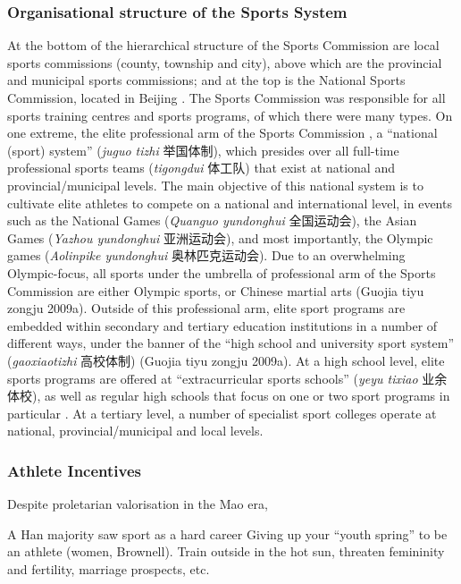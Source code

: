 {\subsubsection{Organisational structure of the Sports System}
At the bottom of the hierarchical structure of the Sports Commission are local sports commissions (county, township and city), above which are the provincial and municipal sports commissions; and at the top is the National Sports Commission, located in Beijing \citep[59]{Brownell1995}.  The Sports Commission was responsible for all sports training centres and sports programs, of which there were many types.  On one extreme, the elite professional arm of the Sports Commission , a ``national (sport) system'' (\textit{juguo tizhi} 举国体制), which presides over all full-time professional sports teams (\textit{tigongdui} 体工队) that exist at national and provincial/municipal levels.  The main objective of this national system is to cultivate elite athletes to compete on a national and international level, in events such as the National Games (\textit{Quanguo yundonghui} 全国运动会), the Asian Games (\textit{Yazhou yundonghui} 亚洲运动会), and most importantly, the Olympic games (\textit{Aolinpike yundonghui} 奥林匹克运动会).  Due to an overwhelming Olympic-focus, all sports under the umbrella of professional arm of the Sports Commission are either Olympic sports, or Chinese martial arts (Guojia tiyu zongju 2009a).  Outside of this professional arm, elite sport programs are embedded within secondary and tertiary education institutions in a number of different ways, under the banner of the ``high school and university sport system'' (\textit{gaoxiaotizhi} 高校体制) (Guojia tiyu zongju 2009a).  At a high school level, elite sports programs are offered at ``extracurricular sports schools'' (\textit{yeyu tixiao} 业余体校), as well as regular high schools that focus on one or two sport programs in particular \citep[59]{Brownell1995}. At a tertiary level, a number of specialist sport colleges operate at national, provincial/municipal and local levels.


\subsubsection{Athlete Incentives}

Despite proletarian valorisation in the Mao era,

A Han majority saw sport as a hard career
Giving up your ``youth spring'' to be an athlete (women, Brownell).  Train outside in the hot sun, threaten femininity and fertility, marriage prospects, etc.

}
